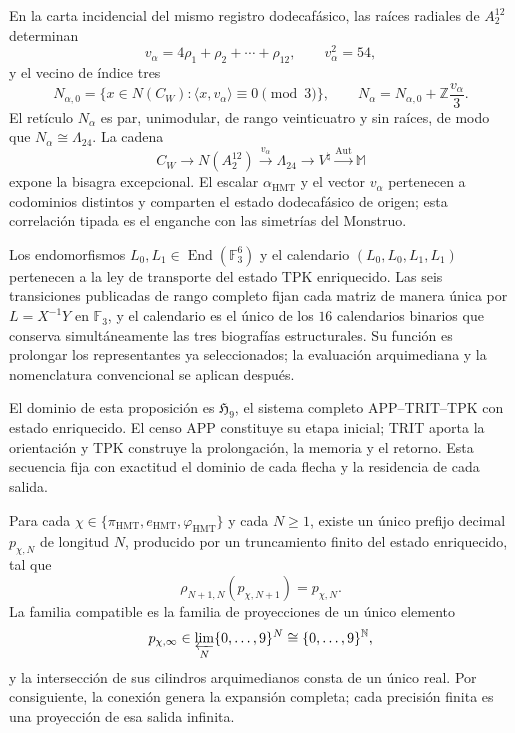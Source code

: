 \begin{theorem}
\label{thm:c27-alpha-rama-excepcional}
En la carta incidencial del mismo registro dodecafásico, las raíces radiales
de \(A_2^{12}\) determinan
\[
v_\alpha=4\rho_1+\rho_2+\cdots+\rho_{12},
\qquad v_\alpha^2=54,
\]
y el vecino de índice tres
\[
N_{\alpha,0}
=\{x\in N(C_W):\langle x,v_\alpha\rangle\equiv0\pmod3\},
\qquad
N_\alpha=N_{\alpha,0}+\mathbb Z\frac{v_\alpha}{3}.
\]
El retículo \(N_\alpha\) es par, unimodular, de rango veinticuatro y sin
raíces, de modo que \(N_\alpha\cong\Lambda_{24}\). La cadena
\[
C_W\longrightarrow N(A_2^{12})
\xrightarrow{v_\alpha}\Lambda_{24}
\longrightarrow V^\natural
\xrightarrow{\operatorname{Aut}}\mathbb M
\]
expone la bisagra excepcional. El escalar \(\alpha_{\mathrm{HMT}}\) y el
vector \(v_\alpha\) pertenecen a codominios distintos y comparten el estado
dodecafásico de origen; esta correlación tipada es el enganche con las
simetrías del Monstruo.
\end{theorem}

\begin{proposition}
\label{prop:c27-estatuto-l0-l1}
Los endomorfismos \(L_0,L_1\in\operatorname{End}(\mathbb F_3^6)\) y el
calendario \((L_0,L_0,L_1,L_1)\) pertenecen a la ley de transporte del estado
TPK enriquecido. Las seis transiciones publicadas de rango completo fijan
cada matriz de manera única por \(L=X^{-1}Y\) en \(\mathbb F_3\), y el
calendario es el único de los \(16\) calendarios binarios que conserva
simultáneamente las tres biografías estructurales. Su función es prolongar
los representantes ya seleccionados; la evaluación arquimediana y la
nomenclatura convencional se aplican después.
\end{proposition}

El dominio de esta proposición es \(\mathfrak H_9\), el sistema completo
APP--TRIT--TPK con estado enriquecido. El censo APP constituye su etapa
inicial; TRIT aporta la orientación y TPK construye la prolongación, la
memoria y el retorno. Esta secuencia fija con exactitud el dominio de cada
flecha y la residencia de cada salida.

\begin{theorem}
\label{thm:c27-profundidad-arbitraria}
Para cada
\(\chi\in\{\pi_{\mathrm{HMT}},e_{\mathrm{HMT}},
\varphi_{\mathrm{HMT}}\}\) y cada \(N\ge1\), existe un único prefijo
decimal \(p_{\chi,N}\) de longitud \(N\), producido por un truncamiento
finito del estado enriquecido, tal que
\[
 \rho_{N+1,N}(p_{\chi,N+1})=p_{\chi,N}.
\]
La familia compatible es la familia de proyecciones de un único elemento
\[
 p_{\chi,\infty}
 \in\varprojlim_N\{0,\ldots,9\}^{N}
 \cong\{0,\ldots,9\}^{\mathbb N},
\]
y la intersección de sus cilindros arquimedianos consta de un único real.
Por consiguiente, la conexión genera la expansión completa; cada precisión
finita es una proyección de esa salida infinita.
\end{theorem}

